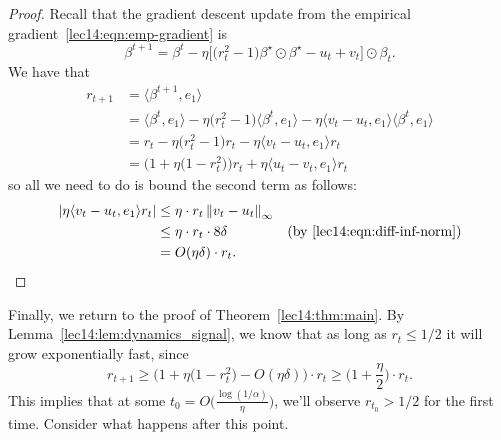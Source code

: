\begin{proof}
    Recall that the gradient descent update from the empirical gradient~\eqref{lec14:eqn:emp-gradient} is
    \begin{equation}
        \beta^{t+1} = \beta^t - \eta \big[\big(r_{t}^{2} -1\big) \beta^\star \odot \beta^\star - u_{t} + v_{t}\big] \odot \beta_{t}.
    \end{equation} 
    We have that
    \begin{align}
        r_{t+1} &= \big\langle \beta^{t+1}, e_1\big\rangle \\
        &= \big\langle \beta^t, e_1\big\rangle - \eta \big(r_{t}^{2} -1\big)\big\langle \beta^t, e_1\big\rangle - \eta \big\langle v_t-u_t, e_1\big\rangle \big\langle \beta^t, e_1 \big\rangle \\
        &= r_t - \eta \big(r_{t}^{2} -1\big) r_t - \eta \big\langle v_t-u_t, e_1\big\rangle r_t \\
        &= \Big(1 + \eta\big( 1 - r_t^2 \big) \Big) r_t + \eta \big\langle u_t-v_t, e_1\big\rangle r_t
    \end{align}
    so all we need to do is bound the second term as follows:
    \begin{align}
        |\eta \langle v_t - u_t, e_1\rangle r_t| &\leq \eta \cdot r_t \left\|v_t-u_t\right\|_\infty \\
        &\leq \eta \cdot r_t \cdot 8\delta &(\text{by \eqref{lec14:eqn:diff-inf-norm}}) \\
        &= O(\eta\delta) \cdot r_t.
    \end{align}
\end{proof}

Finally, we return to the proof of Theorem~\ref{lec14:thm:main}. By Lemma~\ref{lec14:lem:dynamics_signal}, we know that as long as $r_t \leq 1/2$ it will grow exponentially fast, since
\begin{equation}
    r_{t+1} \geq \Big(1 + \eta\big(1-r_t^2\big) - O(\eta\delta) \Big) \cdot r_t \geq \bigg(1 + \frac{\eta}{2}\bigg)\cdot r_t.
\end{equation} 
This implies that at some $t_0 = O\Big(\frac{\log (1/\alpha)}{\eta}\Big)$, we'll observe $r_{t_0} > 1/2$ for the first time. Consider what happens after this point.

